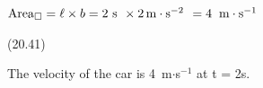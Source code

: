 {\begin{mdframed}[linewidth=4, leftmargin=40, rightmargin=40]
\begin{exercise}
\begin{enumerate}[noitemsep, label=\textbf{Step} \textbf{\arabic*}. ]
{\begin{equation}
      \end{equation}
    }{%
    \setlength{\mymathboxwidth}{\columnwidth}
      \addtolength{\mymathboxwidth}{-48pt}
    \par\vspace{12pt}\noindent\begin{minipage}{\columnwidth}
    \parbox[t]{\mymathboxwidth}{\large\begin{math}
    {\mathrm{Area}}_{\square }=\ell \ensuremath{\times}b=2\phantom{\rule{3.33333pt}{0ex}}\mathrm{s}\phantom{\rule{4pt}{0ex}}\ensuremath{\times}2\phantom{\rule{0.166667em}{0ex}}\mathrm{m}\ensuremath{\cdot}{\mathrm{s}}^{-2}\phantom{\rule{4pt}{0ex}}=4\phantom{\rule{4pt}{0ex}}\phantom{\rule{0.166667em}{0ex}}\mathrm{m}\ensuremath{\cdot}{\mathrm{s}}^{-1}\end{math}}\hfill
    \parbox[t]{48pt}{\raggedleft 
    (20.41)}
    \end{minipage}\vspace{12pt}\par
    }%
    
The velocity of the car is 4~m\begin{math}\ensuremath{\cdot}\end{math}s\begin{math}{}^{-1}\end{math} at t = 2s.






\end{enumerate}
\end{exercise}
\end{mdframed}}
